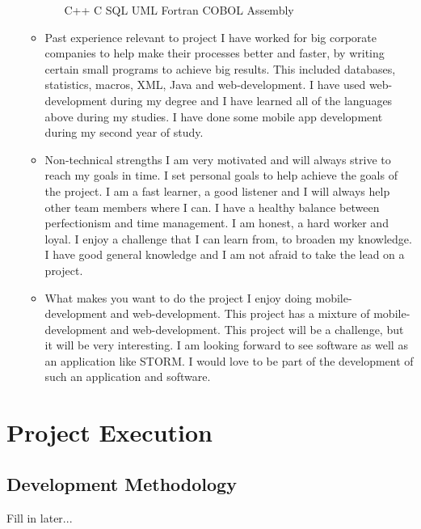 \documentclass[12pt, oneside]{article}
\begin{document}
\begin{enumerate}
\begin{itemize}
\begin{itemize}
					C++\newline
					C\newline
					SQL\newline
					UML\newline	
					Fortran\newline
					COBOL\newline
					Assembly\newline
				\end{itemize}
			\item Past experience relevant to project\newline
				I have worked for big corporate companies to help make their processes better and faster, by writing 						certain small programs to achieve big results. This included databases, statistics, macros, XML, Java and 						web-development. I have used web-development during my degree and I have learned all of the 							languages above during my studies. I have done some mobile app development during my second year of study.
			\item Non-technical strengths\newline
				I am very motivated and will always strive to reach my goals in time. I set personal goals to help achieve 						the goals of the project. I am a fast learner, a good listener and I will always help other team members 						where I can. I have a healthy balance between perfectionism and time management. I am honest, a hard 						worker and loyal. I enjoy a challenge that I can learn from, to broaden my knowledge. I have good 							general knowledge and I am not afraid to take the lead on a project.
			\item What makes you want to do the project\newline
				I enjoy doing mobile-development and web-development. This project has a mixture of mobile-							development and web-development. This project will be a challenge, but it will be very interesting. I am 						looking forward to see software as well as an application like STORM. I would love to be part of the 							development of such an application and software.
		\end{itemize}
	\end{enumerate}
	
\section{Project Execution}
	\subsection{Development Methodology}
		Fill in later...
\end{document}
